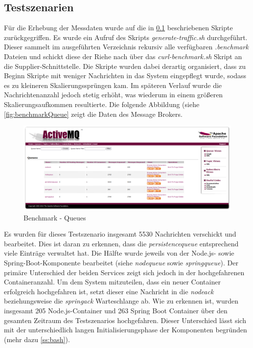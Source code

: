 \subsection{Testszenarien \checkmark}
Für die Erhebung der Messdaten wurde auf die in \ref{}  beschriebenen Skripte zurückgegriffen. Es wurde ein Aufruf des Skripts \emph{generate-traffic.sh} durchgeführt. Dieser sammelt im ausgeführten Verzeichnis rekursiv alle verfügbaren \emph{.benchmark} Dateien und schickt diese der Riehe nach über das \emph{curl-benchmark.sh} Skript an die Supplier-Schnittstelle. Die Skripte wurden dabei derartig organisiert, dass zu Beginn Skripte mit weniger Nachrichten in das System eingepflegt wurde, sodass es zu kleineren Skalierungssprüngen kam. Im späteren Verlauf wurde die Nachrichtenanzahl jedoch stetig erhöht, was wiederum in einem größeren Skalierungsaufkommen resultierte. Die folgende Abbildung (siehe \ref{fig:benchmarkQueue} zeigt die Daten des Message Brokers. 

\begin{figure}[ht!]
	\centering
	\includegraphics[width=\linewidth]{kapitel/problemloesung/implementierung/_img/benchmark-queues}
	\caption[Benchmark - Queues]{Benchmark - Queues}
	\label{fig:benchmarkQueues}
\end{figure}

Es wurden für dieses Testszenario insgesamt 5530 Nachrichten verschickt und bearbeitet. Dies ist daran zu erkennen, dass die \emph{persistencequeue} entsprechend viele Einträge verwaltet hat. Die Hälfte wurde jeweils von der Node.js- sowie Spring-Boot-Komponente bearbeitet (siehe \emph{nodequeue} sowie \emph{springqueue}). Der primäre Unterschied der beiden Services zeigt sich jedoch in der hochgefahrenen Containeranzahl. Um dem System mitzuteilen, dass ein neuer Container erfolgreich hochgefahren ist, setzt dieser eine Nachricht in die \emph{nodeack} beziehungsweise die \emph{springack} Warteschlange ab. Wie zu erkennen ist, wurden insgesamt 205 Node.js-Container und 263 Spring Boot Container über den gesamten Zeitraum des Testszenarios hochgefahren. Dieser Unterschied lässt sich mit der unterschiedlich langen Initialisierungsphase der Komponenten begründen (mehr dazu \ref{ss:bash}).

